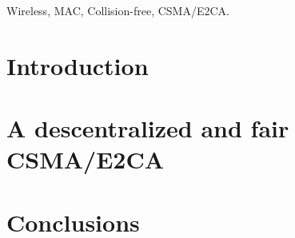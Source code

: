 \documentclass[conference]{IEEEtran}
\begin{document}
\begin{IEEEkeywords}
Wireless, MAC, Collision-free, CSMA/E2CA.
\end{IEEEkeywords}

\section{Introduction} \label{introduction}
  

\section{A descentralized and fair CSMA/E2CA} \label{csmae2ca}
  

\section{Conclusions} \label{conclusions}
  
  


  
\end{document}
